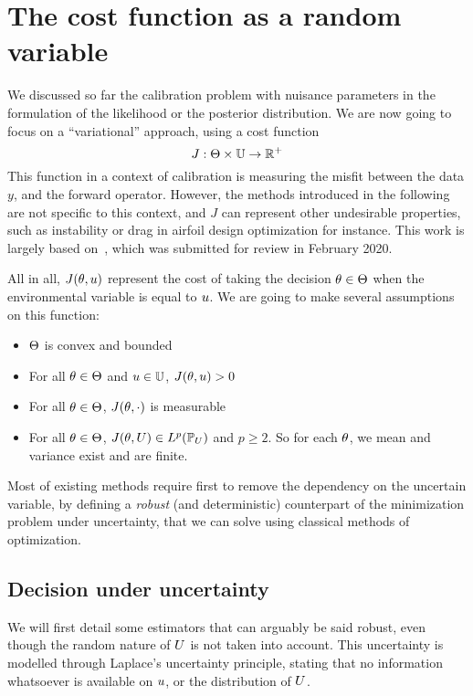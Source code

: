 \documentclass[../../Main_ManuscritThese.tex]{subfiles}
\begin{document}
\section{The cost function as a random variable}
\label{sec:J_rv}
We discussed so far the calibration problem with nuisance parameters in the formulation of the likelihood or the posterior distribution. We are now going to focus on a ``variational'' approach, using a cost function
\begin{equation}
  J: \Theta \times \mathbb{U} \rightarrow \mathbb{R}^+
\end{equation} 
This function in a context of calibration is measuring the misfit between the data $y$, and the forward operator. However, the methods introduced in the following are not specific to this context, and $J$ can represent other undesirable properties, such as instability or drag in airfoil design optimization for instance. This work is largely based on~\cite{trappler_robust_2020}, which was submitted for review in February 2020.


All in all, $J(\theta, u)$ represent the cost of taking the decision $\theta\in\Theta$ when the environmental variable is equal to $u$.
We are going to make several assumptions on this function:
\begin{itemize}
\item $\Theta$ is convex and bounded 
\item For all $\theta \in \Theta$ and $u \in \mathbb{U}$, $J(\theta, u)>0$
\item For all $\theta \in \Theta$, $J(\theta, \cdot)$ is measurable
\item For all $\theta \in \Theta$, $J(\theta, U) \in L^p(\mathbb{P}_{U})$ and $p \geq 2$. So for each $\theta$, we mean and variance exist and are finite.
\end{itemize}

Most of existing methods require first to remove the dependency on the uncertain variable, by defining a \emph{robust} (and deterministic) counterpart of the minimization problem under uncertainty, that we can solve using classical methods of optimization.

\subsection{Decision under uncertainty}
We will first detail some estimators that can arguably be said robust, even though the random nature of $U$ is not taken into account. This uncertainty is modelled through Laplace's uncertainty principle, stating that no information whatsoever is available on $u$, or the distribution of $U$.
\end{document}
